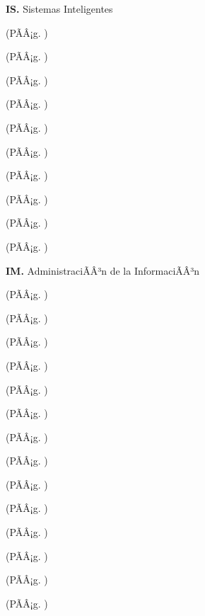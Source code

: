 	\textbf{IS.}  Sistemas Inteligentes%
	\begin{list}{}{%
		\setlength{\labelwidth}{0pt}%
		\setlength{\leftmargin}{15pt}}%
		\item \ISUNODef(PÃÂ¡g. \pageref{sec:BOK-IS1})
		\item \ISDOSDef(PÃÂ¡g. \pageref{sec:BOK-IS2})
		\item \ISTRESDef(PÃÂ¡g. \pageref{sec:BOK-IS3})
		\item \ISCUATRODef(PÃÂ¡g. \pageref{sec:BOK-IS4})
		\item \ISCINCODef(PÃÂ¡g. \pageref{sec:BOK-IS5})
		\item \ISSEISDef(PÃÂ¡g. \pageref{sec:BOK-IS6})
		\item \ISSIETEDef(PÃÂ¡g. \pageref{sec:BOK-IS7})
		\item \ISOCHODef(PÃÂ¡g. \pageref{sec:BOK-IS8})
		\item \ISNUEVEDef(PÃÂ¡g. \pageref{sec:BOK-IS9})
		\item \ISDIEZDef(PÃÂ¡g. \pageref{sec:BOK-IS10})
	\end{list}%
	\textbf{IM.}  AdministraciÃÂ³n de la InformaciÃÂ³n%
	\begin{list}{}{%
		\setlength{\labelwidth}{0pt}%
		\setlength{\leftmargin}{15pt}}%
		\item \IMUNODef(PÃÂ¡g. \pageref{sec:BOK-IM1})
		\item \IMDOSDef(PÃÂ¡g. \pageref{sec:BOK-IM2})
		\item \IMTRESDef(PÃÂ¡g. \pageref{sec:BOK-IM3})
		\item \IMCUATRODef(PÃÂ¡g. \pageref{sec:BOK-IM4})
		\item \IMCINCODef(PÃÂ¡g. \pageref{sec:BOK-IM5})
		\item \IMSEISDef(PÃÂ¡g. \pageref{sec:BOK-IM6})
		\item \IMSIETEDef(PÃÂ¡g. \pageref{sec:BOK-IM7})
		\item \IMOCHODef(PÃÂ¡g. \pageref{sec:BOK-IM8})
		\item \IMNUEVEDef(PÃÂ¡g. \pageref{sec:BOK-IM9})
		\item \IMDIEZDef(PÃÂ¡g. \pageref{sec:BOK-IM10})
		\item \IMONCEDef(PÃÂ¡g. \pageref{sec:BOK-IM11})
		\item \IMDOCEDef(PÃÂ¡g. \pageref{sec:BOK-IM12})
		\item \IMTRECEDef(PÃÂ¡g. \pageref{sec:BOK-IM13})
		\item \IMCATORCEDef(PÃÂ¡g. \pageref{sec:BOK-IM14})
	\end{list}%
